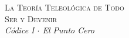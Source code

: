 \documentclass[10pt, openany, oneside]{book}
\renewcommand{\normalsize}{\fontsize{10}{13}\selectfont}
\begin{document}
%
%
%

%
%
%


\thispagestyle{empty}
\vspace*{\fill}
\begin{center}
    {\normalsize\scshape La Teoría Teleológica de Todo}\\[1.5em]
    {\fontsize{24}{28}\selectfont\scshape Ser y Devenir}\\[0.8em]
    {\normalsize\itshape Códice I $\cdot$ El Punto Cero}
\end{center}
\vspace*{\fill}
\newpage

\end{document}

